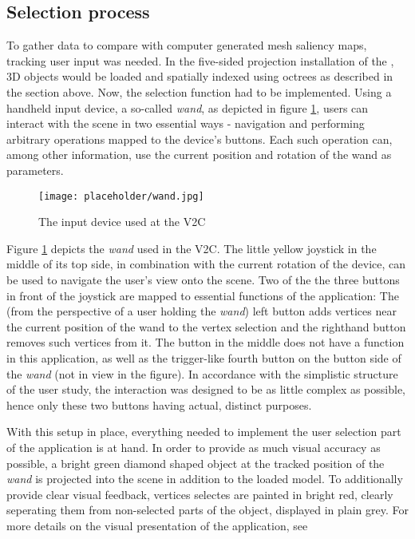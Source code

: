 		\subsection{Selection process}
		\label{sec:selection_process}

To gather data to compare with computer generated mesh saliency maps, tracking user input was needed. In the five-sided projection installation of the \cite{v2c}, 3D objects would be loaded and spatially indexed using octrees as described in the section above. Now, the selection function had to be implemented. Using a handheld input device, a so-called \textit{wand}, as depicted in figure \ref{fig:wand}, users can interact with the scene in two essential ways - navigation and performing arbitrary operations mapped to the device's buttons. Each such operation can, among other information, use the current position and rotation of the wand as parameters.

\begin{figure}[htb]
  \centering
  \texttt{[image: placeholder/wand.jpg]}\\ %
  \caption{The input device used at the V2C}\label{fig:wand}
\end{figure}

Figure \ref{fig:wand} depicts the \textit{wand} used in the V2C. The little yellow joystick in the middle of its top side, in combination with the current rotation of the device, can be used to navigate the user's view onto the scene. Two of the the three buttons in front of the joystick are mapped to essential functions of the application: The (from the perspective of a user holding the \textit{wand}) left button adds vertices near the current position of the wand to the vertex selection and the righthand button removes such vertices from it. The button in the middle does not have a function in this application, as well as the trigger-like fourth button on the button side of the \textit{wand} (not in view in the figure).
In accordance with the simplistic structure of the user study, the interaction was designed to be as little complex as possible, hence only these two buttons having actual, distinct purposes. 

With this setup in place, everything needed to implement the user selection part of the application is at hand. In order to provide as much visual accuracy as possible, a bright green diamond shaped object at the tracked position of the \textit{wand} is projected into the scene in addition to the loaded model. To additionally provide clear visual feedback, vertices selectes are painted in bright red, clearly seperating them from non-selected parts of the object, displayed in plain grey. For more details on the visual presentation of the application, see 

